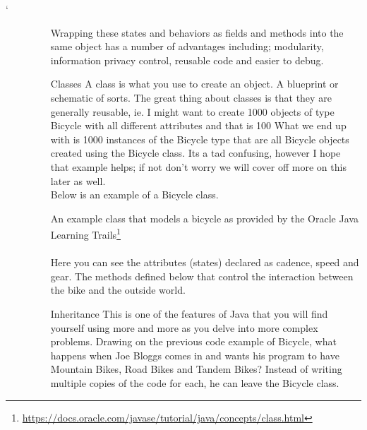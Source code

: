 `\documentclass[a4paper,11pt]{report}
\begin{document}
\begin{description}
\begin{itemize}
								Wrapping these states and behaviors as fields and methods into the same object has a number of advantages including; modularity, information privacy control, reusable code and easier to debug.

							\item[Classes]
								A class is what you use to create an object. A blueprint or schematic of sorts. The great thing about classes is that they are generally reusable, ie. I might want to create 1000 objects of type Bicycle with all different attributes and that is 100%
								What we end up with is 1000 instances of the Bicycle type that are all Bicycle objects created using the Bicycle class. Its a tad confusing, however I hope that example helps; if not don't worry we will cover off more on this later as well.\\
								Below is an example of a Bicycle class.

								
								An example class that models a bicycle as provided by the Oracle Java Learning Trails\footnote{\url{https://docs.oracle.com/javase/tutorial/java/concepts/class.html}}\\\\

								Here you can see the attributes (states) declared as cadence, speed and gear. The methods defined below that control the interaction between the bike and the outside world.


							\pagebreak

							\item[Inheritance]
								This is one of the features of Java that you will find yourself using more and more as you delve into more complex problems.
								Drawing on the previous code example of Bicycle, what happens when Joe Bloggs comes in and wants his program to have Mountain Bikes, Road Bikes and Tandem Bikes?
								Instead of writing multiple copies of the code for each, he can leave the Bicycle class.




\end{itemize}
\end{description}
\end{document}

